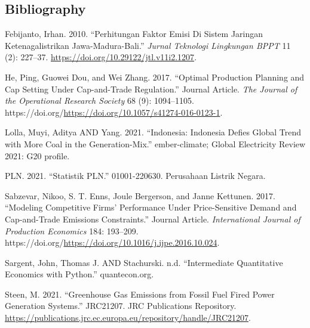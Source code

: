 \documentclass[
  a4paper,
  DIV=11,
  numbers=noendperiod]{scrartcl}
\newlength{\cslhangindent}
\newlength{\cslentryspacingunit} %
\newenvironment{CSLReferences}[2] %
 {%
  \setlength{\parindent}{0pt}
  \ifodd #1
  \let\oldpar\par
  \def\par{\hangindent=\cslhangindent\oldpar}
  \fi
  \setlength{\parskip}{#2\cslentryspacingunit}
 }%
 {}
\begin{document}
\hypertarget{section}{%
\subsection{}\label{section}}

\hypertarget{bibliography}{%
\subsection*{Bibliography}\label{bibliography}}

\hypertarget{refs}{}
\begin{CSLReferences}{1}{0}
\leavevmode{}%
Febijanto, Irhan. 2010. {``Perhitungan Faktor Emisi Di Sistem Jaringan
Ketenagalistrikan Jawa-Madura-Bali.''} \emph{Jurnal Teknologi Lingkungan
BPPT} 11 (2): 227--37. \url{https://doi.org/10.29122/jtl.v11i2.1207}.

\leavevmode{}%
He, Ping, Guowei Dou, and Wei Zhang. 2017. {``Optimal Production
Planning and Cap Setting Under Cap-and-Trade Regulation.''} Journal
Article. \emph{The Journal of the Operational Research Society} 68 (9):
1094--1105.
https://doi.org/\url{https://doi.org/10.1057/s41274-016-0123-1}.

\leavevmode{}%
Lolla, Muyi, Aditya AND Yang. 2021. {``Indonesia: Indonesia Defies
Global Trend with More Coal in the Generation-Mix.''} ember-climate;
Global Electricity Review 2021: G20 profile.

\leavevmode{}%
PLN. 2021. {``Statistik PLN.''} 01001-220630. Perusahaan Listrik Negara.

\leavevmode{}%
Sabzevar, Nikoo, S. T. Enns, Joule Bergerson, and Janne Kettunen. 2017.
{``Modeling Competitive Firms' Performance Under Price-Sensitive Demand
and Cap-and-Trade Emissions Constraints.''} Journal Article.
\emph{International Journal of Production Economics} 184: 193--209.
https://doi.org/\url{https://doi.org/10.1016/j.ijpe.2016.10.024}.

\leavevmode{}%
Sargent, John, Thomas J. AND Stachurski. n.d. {``Intermediate
Quantitative Economics with Python.''} quantecon.org.

\leavevmode{}%
Steen, M. 2021. {``Greenhouse Gas Emissions from Fossil Fuel Fired Power
Generation Systems.''} JRC21207. JRC Publications Repository.
\url{https://publications.jrc.ec.europa.eu/repository/handle/JRC21207}.

\end{CSLReferences}
\end{document}
